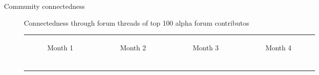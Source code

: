 \cleardoublepage
\changepapersize{305.3mm:210mm}

\begin{minipage}{147.3mm}
{
	\LARGE
	\noindent Community connectedness \par
}
\begin{figure}[H]
	\centering
	
	\caption{Connectedness through forum threads of top 100 alpha forum contributos}
	\label{figure:year}
\end{figure}
\end{minipage}

\newpage
{}
\begin{minipage}[t]{0.7\textwidth}
\begin{figure}[H]
  \begin{adjustbox}{width=\textwidth, keepaspectratio}
      \begin{tabular}{cccc}
          \begin{subfigure}[b]{0.24\textwidth}
              \centering
              
              \caption{Month 1}
              \label{fig:month1}
          \end{subfigure} &
          \begin{subfigure}[b]{0.24\textwidth}
              \centering
              
              \caption{Month 2}
              \label{fig:month2}
          \end{subfigure} &
          \begin{subfigure}[b]{0.24\textwidth}
              \centering
              
              \caption{Month 3}
              \label{fig:month3}
          \end{subfigure} &
          \begin{subfigure}[b]{0.24\textwidth}
              \centering
              
              \caption{Month 4}
              \label{fig:month4}
          \end{subfigure} \\
          \begin{subfigure}[b]{0.24\textwidth}
              \centering
              

\end{subfigure}
\end{tabular}
\end{adjustbox}
\end{figure}
\end{minipage}
